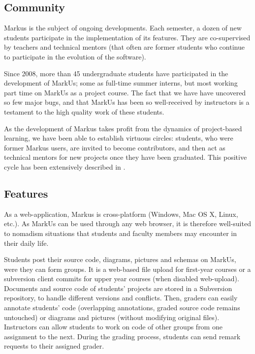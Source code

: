 \documentclass[twocolumn,10pt]{asme2e}
\begin{document}
\subsection*{Community}
Markus is the subject of ongoing developments. Each semester, a dozen of new students participate in the implementation of its features. They are co-supervised by teachers and technical mentors (that often are former students who continue to participate in the evolution of the software).

Since 2008, more than 45 undergraduate students have participated in the development of MarkUs; some as full-time summer interns, but most working part time on MarkUs as a project course. The fact that we have have uncovered so few major bugs, and that MarkUs has been so well-received by instructors is a testament to the high quality work of these students. 

As the development of Markus takes profit from the dynamics of project-based learning, we have been able to establish virtuous circles: students, who were former Markus users, are invited to become contributors, and then act as technical mentors for new projects once they have been graduated. This positive cycle has been extensively described in \cite{magnin-qpes-2011}.

\subsection*{Features}

As a web-application, Markus is cross-platform (Windows, Mac OS X, Linux, etc.). As MarkUs can be used through any web browser, it is therefore well-suited to nomadism situations that students and faculty members may encounter in their daily life.

Students post their source code, diagrams, pictures and schemas on MarkUs, were they can form groups. It is a web-based file upload for first-year courses or a subversion client commits for upper year courses (when disabled web-upload). Documents and source code of students' projects are stored in a Subversion repository, to handle different versions and conflicts. Then, graders can easily annotate students' code (overlapping annotations, graded source code remains untouched) or diagrams and pictures (without modifying original files). Instructors can allow students to work on code of other groups from one assignment to the next. During the grading process, students can send remark requests to their assigned grader.
\end{document}
